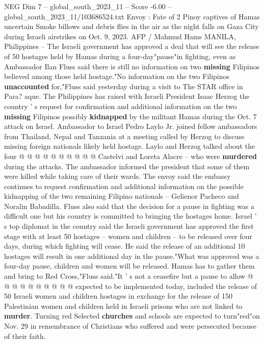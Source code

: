 \begin{textsample}{NEG Dim 7 – global\_south\_2023\_11 – Score -6.00 – global\_south\_2023\_11/103686524.txt}  \label{ex:f7_neg_328}
Envoy : Fate of 2 Pinoy captives of Hamas uncertain Smoke billows and debris flies in the air as the night falls on Gaza City during Israeli airstrikes on Oct. 9, 2023.
AFP / Mahmud Hams MANILA, Philippines -- The Israeli government has approved a deal that will see the release of 50 hostages held by Hamas during a four-day"pause"in fighting, even as Ambassador Ilan Fluss said there is still no information on two \textbf{missing} Filipinos believed among those held hostage."No information on the two Filipinos \textbf{unaccounted} for,"Fluss said yesterday during a visit to The STAR office in Para? aque.
The Philippines has raised with Israeli President Isaac Herzog the country ' s request for confirmation and additional information on the two \textbf{missing} Filipinos possibly \textbf{kidnapped} by the militant Hamas during the Oct. 7 attack on Israel.
Ambassador to Israel Pedro Laylo Jr. joined fellow ambassadors from Thailand, Nepal and Tanzania at a meeting called by Herzog to discuss missing foreign nationals likely held hostage.
Laylo and Herzog talked about the four @ @ @ @ @ @ @ @ @ @ Castelvi and Loreta Alacre -- who were \textbf{murdered} during the attacks.
The ambassador informed the president that some of them were killed while taking care of their wards.
The envoy said the embassy continues to request confirmation and additional information on the possible kidnapping of the two remaining Filipino nationals -- Gelienor Pacheco and Noralin Babadilla.
Fluss also said that the decision for a pause in fighting was a difficult one but his country is committed to bringing the hostages home.
Israel ' s top diplomat in the country said the Israeli government has approved the first stage with at least 50 hostages -- women and children -- to be released over four days, during which fighting will cease.
He said the release of an additional 10 hostages will result in one additional day in the pause."What was approved was a four-day pause, children and women will be released.
Hamas has to gather them and bring to Red Cross,"Fluss said."It ' s not a ceasefire but a pause to allow @ @ @ @ @ @ @ @ @ @ expected to be implemented today, included the release of 50 Israeli women and children hostages in exchange for the release of 150 Palestinian women and children held in Israeli prisons who are not linked to \textbf{murder}.
Turning red Selected \textbf{churches} and schools are expected to turn"red"on Nov. 29 in remembrance of Christians who suffered and were persecuted because of their faith.

\end{textsample}
